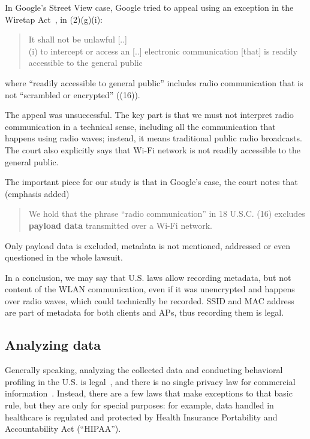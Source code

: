 \documentclass[12pt,a4paper,oneside,pdftex]{report}
\begin{document}
In Google's Street View case, Google tried to appeal using an exception in the Wiretap Act~\cite{google_joffe}, in (2)(g)(i):

\begin{quote}
    It shall not be unlawful [..] \\
    (i) to intercept or access an [..] electronic communication [that] is readily accessible to the general public
\end{quote}
where ``readily accessible to general public'' includes radio communication that is not ``scrambled or encrypted'' ((16)). 

The appeal was unsuccessful. The key part is that we must not interpret radio communication in a technical sense, including all the communication that happens using radio waves; instead, it means traditional public radio broadcasts. The court also explicitly says that Wi-Fi network is not readily accessible to the general public.

The important piece for our study is that in Google's case, the court notes that~\cite{google_joffe} (emphasis added)

\begin{quote}
    We hold that the phrase ``radio communication'' in 18 U.S.C. (16) excludes \textbf{payload data} transmitted over a Wi-Fi network.
\end{quote}
Only payload data is excluded, metadata is not mentioned, addressed or even questioned in the whole lawsuit.

In a conclusion, we may say that U.S. laws allow recording metadata, but not content of the WLAN communication, even if it was unencrypted and happens over radio waves, which could technically be recorded. SSID and MAC address are part of metadata for both clients and APs, thus recording them is legal.

\subsection{Analyzing data}

Generally speaking, analyzing the collected data and conducting behavioral profiling in the U.S. is legal~\cite{jennings2012track}, and there is no single privacy law for commercial information~\cite{yeatesprivacy,jennings2012track}. Instead, there are a few laws that make exceptions to that basic rule, but they are only for special purposes: for example, data handled in healthcare is regulated and protected by Health Insurance Portability and Accountability Act (``HIPAA'').~\cite{jennings2012track}
\end{document}

